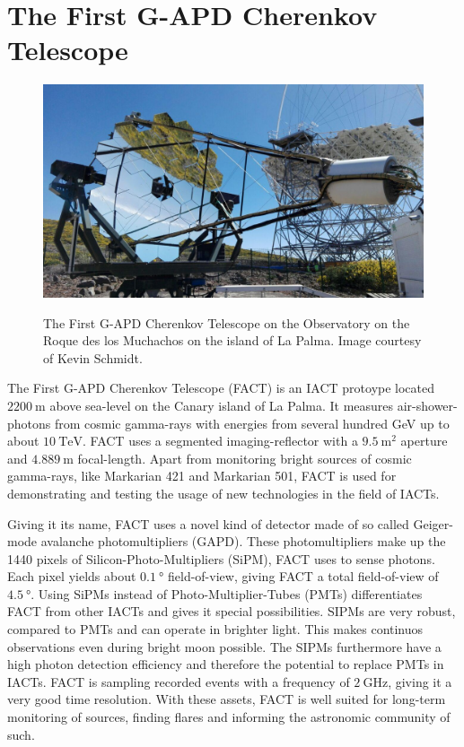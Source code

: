 \chapter{The First G-APD Cherenkov Telescope}
%
\begin{figure}
  \centering
  \includegraphics[width=\textwidth]{Plots/fact.jpg}
  \label{fig:fact}
  \caption{The First G-APD Cherenkov Telescope on the Observatory on the Roque des los Muchachos on the island of La Palma. Image courtesy of Kevin Schmidt.}
\end{figure}
%
The First G-APD Cherenkov Telescope \cite{FACT-Design} (FACT) is an IACT
protoype located $\SI{2200}{\metre}$ above sea-level on the Canary island of La
Palma. It measures air-shower-photons from cosmic gamma-rays with energies from
several hundred GeV up to about $\SI{10}{\tera\electronvolt}$. FACT uses a
segmented imaging-reflector with a $\SI{9.5}{\meter\squared}$ aperture and
$\SI{4.889}{\meter}$ focal-length. Apart from monitoring bright sources of
cosmic gamma-rays, like Markarian 421 and Markarian 501, FACT is used for
demonstrating and testing the usage of new technologies in the field of IACTs.

Giving it its name, FACT uses a novel kind of detector made of so called
Geiger-mode avalanche photomultipliers (GAPD). These photomultipliers make up
the 1440 pixels of Silicon-Photo-Multipliers (SiPM), FACT uses to sense
photons. Each pixel yields about $\SI{0.1}{\degree}$ field-of-view, giving FACT
a total field-of-view of $\SI{4.5}{\degree}$. Using SiPMs instead of
Photo-Multiplier-Tubes (PMTs) differentiates FACT from other IACTs and gives it
special possibilities. SIPMs are very robust, compared to PMTs and can operate
in brighter light. This makes continuos observations even during bright moon
possible. The SIPMs furthermore have a high photon detection efficiency and
therefore the potential to replace PMTs in IACTs. FACT is sampling recorded
events with a frequency of $\SI{2}{\giga\hertz}$, giving it a very good time
resolution. With these assets, FACT is well suited for long-term monitoring of
sources, finding flares and informing the astronomic community of such.
